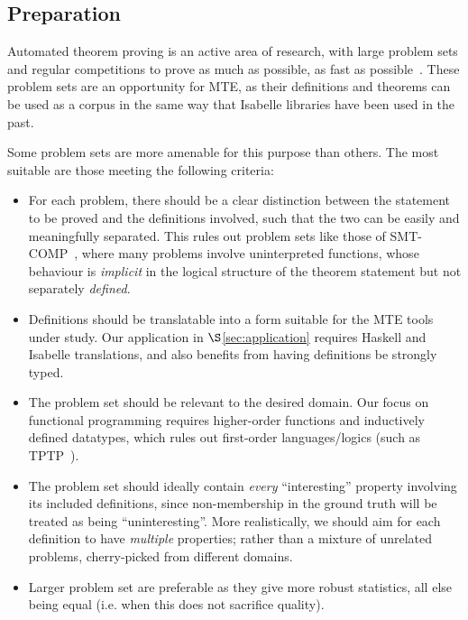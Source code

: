 \subsection{Preparation}
\label{section:prep}

Automated theorem proving is an active area of research, with large problem sets
and regular competitions to prove as much as possible, as fast as
possible~\cite{pelletier2002development}. These problem sets are an opportunity
for MTE, as their definitions and theorems can be used as a corpus in the same
way that Isabelle libraries have been used in the past.

Some problem sets are more amenable for this purpose than others. The most
suitable are those meeting the following criteria:

\begin{itemize}
\item For each problem, there should be a clear distinction between the
  statement to be proved and the definitions involved, such that the two can be
  easily and meaningfully separated. This rules out problem sets like those of
  SMT-COMP~\cite{barrett2005smt}, where many problems involve uninterpreted
  functions, whose behaviour is \emph{implicit} in the logical structure of the
  theorem statement but not separately \emph{defined}.
\item Definitions should be translatable into a form suitable for the MTE tools
  under study. Our application in $\S$\ref{sec:application} requires Haskell and
  Isabelle translations, and also benefits from having definitions be strongly
  typed.
\item The problem set should be relevant to the desired domain. Our focus on
  functional programming requires higher-order functions and inductively defined
  datatypes, which rules out first-order languages/logics (such as
  TPTP~\cite{sutcliffe2009tptp}).
\item The problem set should ideally contain \emph{every} ``interesting''
  property involving its included definitions, since non-membership in the
  ground truth will be treated as being ``uninteresting''. More realistically,
  we should aim for each definition to have \emph{multiple} properties; rather
  than a mixture of unrelated problems, cherry-picked from different domains.
\item Larger problem set are preferable as they give more robust statistics, all
  else being equal (i.e. when this does not sacrifice quality).
\end{itemize}

